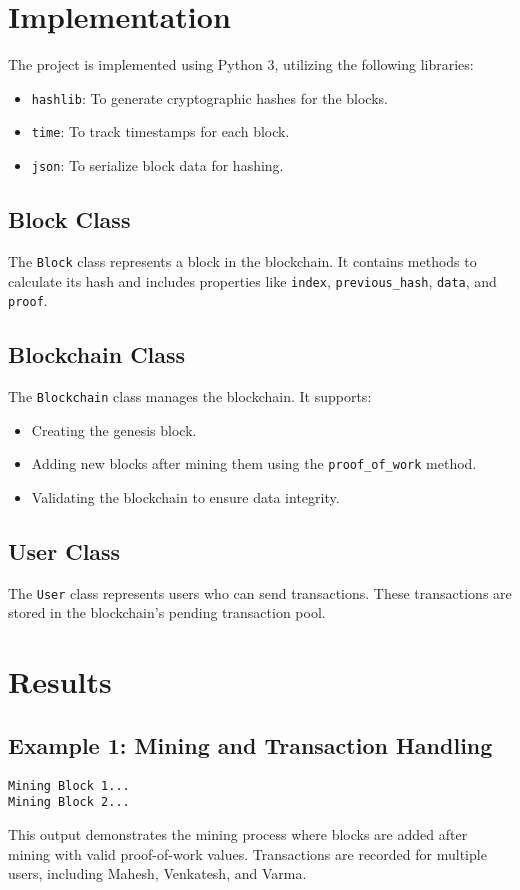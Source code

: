 \documentclass[sigconf]{acmart}
\begin{document}
\section{Implementation}

The project is implemented using Python 3, utilizing the following libraries:
\begin{itemize}
    \item \texttt{hashlib}: To generate cryptographic hashes for the blocks.
    \item \texttt{time}: To track timestamps for each block.
    \item \texttt{json}: To serialize block data for hashing.
\end{itemize}

\subsection{Block Class}
The \texttt{Block} class represents a block in the blockchain. It contains methods to calculate its hash and includes properties like \texttt{index}, \texttt{previous\_hash}, \texttt{data}, and \texttt{proof}.

\subsection{Blockchain Class}
The \texttt{Blockchain} class manages the blockchain. It supports:
\begin{itemize}
    \item Creating the genesis block.
    \item Adding new blocks after mining them using the \texttt{proof\_of\_work} method.
    \item Validating the blockchain to ensure data integrity.
\end{itemize}

\subsection{User Class}
The \texttt{User} class represents users who can send transactions. These transactions are stored in the blockchain's pending transaction pool.

\section{Results}

\subsection{Example 1: Mining and Transaction Handling}
\begin{verbatim}
Mining Block 1...
Mining Block 2...
\end{verbatim}
This output demonstrates the mining process where blocks are added after mining with valid proof-of-work values. Transactions are recorded for multiple users, including Mahesh, Venkatesh, and Varma.
\end{document}

